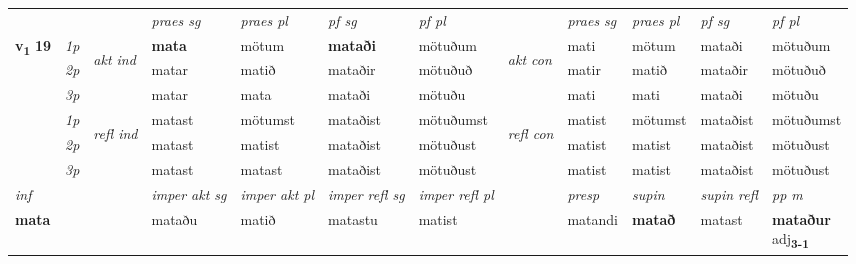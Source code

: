 \begin{longtable}[l]{X>{\footnotesize\itshape}llXXXXlXXXX}
\midrule

 & &   & \textit{praes sg}  & \textit{praes pl}    & \textit{ pf sg} & \textit{pf pl} & & \textit{praes sg}  & \textit{praes pl}    & \textit{pf sg} & \textit{pf pl }  \\ \cmidrule{4-7} \cmidrule{9-12}
 \multirow{2}{*}{{{\textbf{v{\textsubscript{1}}} \Large{\textbf{19}}}}}  & 1p & \multirow{3}{*}{\begin{turn}{90}\textit{akt ind}\end{turn}} & \textbf{mata} & mötum & \textbf{mataði} & mötuðum & \multirow{3}{*}{\begin{turn}{90}\textit{akt con}\end{turn}} &mati & mötum & mataði & mötuðum\\*
 & 2p &  &  matar  & matið & mataðir & mötuðuð & & matir & matið & mataðir & mötuðuð \\*
 & 3p &  & matar & mata & mataði & mötuðu & & mati & mati& mataði & mötuðu \\*
\cmidrule{4-7} \cmidrule{9-12}
 & 1p & \multirow{3}{*}{\begin{turn}{90}\textit{refl ind}\end{turn}}  & matast & mötumst & mataðist & mötuðumst & \multirow{3}{*}{\begin{turn}{90}\textit{refl con}\end{turn}}  &matist & mötumst & mataðist & mötuðumst \\*
 & 2p &  & matast & matist & mataðist & mötuðust & &matist & matist & mataðist & mötuðust \\*
 & 3p  & & matast & matast & mataðist & mötuðust & & matist & matist& mataðist & mötuðust \\*
\cmidrule{4-7} \cmidrule{9-12}

   {\textit{inf}} & &  & \textit{imper akt sg} & \textit{imper akt pl} & \textit{imper refl sg} & \textit{imper refl pl} && \textit{presp} & \textit{supin} & \textit{supin refl} & \textit{pp m} \\*
  {\textbf{mata}} & && mataðu  & matið & matastu & matist && matandi &  \textbf{matað} & matast & \specialcell{\textbf{mataður} \\ adj\textbf{\textsubscript{3-1}}} \\*

\midrule


\end{longtable}
